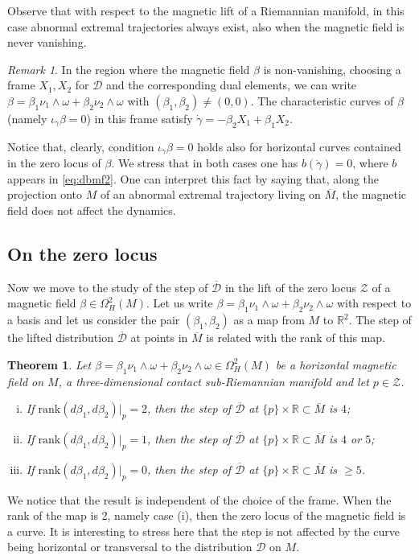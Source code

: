 \documentclass{amsart}
\theoremstyle{plain}
\newtheorem{theorem}{Theorem}
\theoremstyle{definition}
\theoremstyle{remark}
\newtheorem{remark}[thm]{Remark}
\newcommand{\R}{\mathbb{R}}
\newcommand{\diff}{d}%
\newcommand{\p}{\partial}												%
\newcommand{\sr}{sub-{R}ie\-man\-nian }
\newcommand{\distr}{\mathcal{D}}								%
\newcommand{\B}{\beta}
\newcommand{\lift}[1]{\overline{#1}} 							%
\newcommand{\mg}{\B_1\nu_1\wedge \omega
										+\B_2\nu_2\wedge \omega}	%
\begin{document}
 Observe that with respect to the magnetic lift of a Riemannian manifold, in this case abnormal extremal trajectories always exist, also when the magnetic field is never vanishing.  

\begin{remark} \label{r:intdb}
In the region where the magnetic field $\beta$ is non-vanishing, choosing a frame $X_1,X_2$ for $\distr$ and the corresponding dual elements, we can write $\B=\mg$ with $(\beta_{1},\beta_{2})\neq (0,0)$. The characteristic curves of $\beta$ (namely $\iota_{\dot\gamma} \beta =0$)
in this frame satisfy $\dot \gamma=-\beta_{2}X_{1}+\beta_{1}X_{2}$. 

Notice that, clearly, condition  $\iota_{\dot\gamma} \beta =0$ holds also for horizontal curves contained in the zero locus of $\beta$.
We stress that in both cases one has  $b(\dot \gamma)=0$, where $b$ appears in \eqref{eq:dbmf2}.
One can interpret this fact by saying that, along the projection onto $M$ of an abnormal extremal trajectory living on $\lift M$,  the magnetic field does not affect the dynamics.

\end{remark}


\subsection{On the zero locus}
Now we move to the study of the step of $\lift \distr$ in the lift of the zero locus $\mathcal{Z}$ of a magnetic field $\B\in\Omega^2_H(M)$. Let us write $\B=\mg$  with respect to a basis and let us consider the pair $(\beta_{1},\beta_{2})$ as a map from $M$ to $\R^{2}$. The step of the lifted distribution $\lift \distr$ at points in $\lift M$ is related with the rank of this map. 

\begin{theorem}
\label{intro:step-rank}
Let   $\B=\mg\in\Omega^2_H(M)$ be a horizontal magnetic field on $M$, a three-dimensional contact \sr manifold and let $p\in \mathcal{Z}$. 
\begin{enumerate}[(i)]
\item \label{itemintro:step2} If $\mathrm{rank}\left(\diff \B_1,\diff \B_2\right)|_{p}=2$, then the step of $\lift \distr$ at $\{ p \}\times \R \subset \lift M$ is $4$;
\item \label{itemintro:step1} If $\mathrm{rank}\left(\diff \B_1,\diff \B_2\right)|_{p}=1$, then the step of $\lift \distr$ at $\{ p \}\times \R \subset \lift M$ is $4$ or $5$;
\item \label{itemintro:step0} If $\mathrm{rank}\left(\diff \B_1,\diff \B_2\right)|_{p}=0$, then the step of $\lift \distr$ at $\{ p \}\times \R \subset \lift M$ is $\geq 5$.
\end{enumerate}
\end{theorem}
We notice that the result is independent of the choice of the frame.
When the rank of the map is 2, namely case (i), then the zero locus of the magnetic field is a curve. It is interesting to stress here that the step is not affected by the curve being horizontal or transversal to the distribution $\distr$ on $M$.
\end{document}
